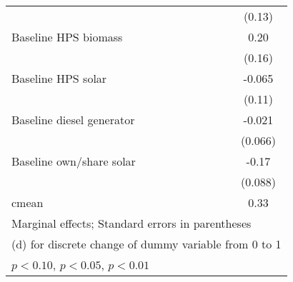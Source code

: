\begin{table}[htbp]
\begin{tabular*}{1\hsize}{@{\hskip\tabcolsep\extracolsep\fill}l*{5}{c}}
                &                  &                  &                  &                  &   (0.13)         \\
Baseline HPS biomass&                  &                  &                  &                  &     0.20         \\
                &                  &                  &                  &                  &   (0.16)         \\
Baseline HPS solar&                  &                  &                  &                  &   -0.065         \\
                &                  &                  &                  &                  &   (0.11)         \\
Baseline diesel generator&                  &                  &                  &                  &   -0.021         \\
                &                  &                  &                  &                  &  (0.066)         \\
Baseline own/share solar&                  &                  &                  &                  &    -0.17\sym{*}  \\
                &                  &                  &                  &                  &  (0.088)         \\
\midrule
cmean           &                  &                  &                  &                  &     0.33         \\
\bottomrule
\multicolumn{6}{l}{\footnotesize Marginal effects; Standard errors in parentheses}\\
\multicolumn{6}{l}{\footnotesize  (d) for discrete change of dummy variable from 0 to 1}\\
\multicolumn{6}{l}{\footnotesize \sym{*} \(p<0.10\), \sym{**} \(p<0.05\), \sym{***} \(p<0.01\)}\\
\end{tabular*}
\end{table}
